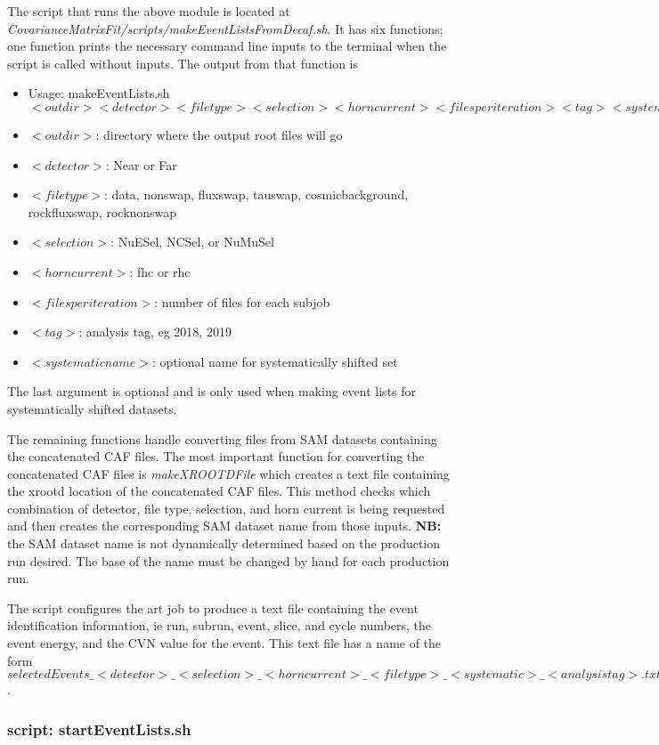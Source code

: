 The script that runs the above module is located at {\it CovarianceMatrixFit/scripts/makeEventListsFromDecaf.sh}.  It has six functions; one function prints the necessary command line inputs to the terminal when the script is called without inputs.  The output from that function is
\begin{itemize}
 \item Usage: makeEventLists.sh $<outdir> <detector> <file type> <selection> <horn current> <files per iteration> <tag> <systematic name>$
 \item $<outdir>$: directory where the output root files will go
 \item $<detector>$: Near or Far
 \item $<file type>$: data, nonswap, fluxswap, tauswap, cosmicbackground, rockfluxswap, rocknonswap
 \item $<selection>$: NuESel, NCSel, or NuMuSel
 \item $<horn current>$: fhc or rhc
 \item $<files per iteration>$: number of files for each subjob
 \item $<tag>$: analysis tag, eg 2018, 2019
 \item $<systematic name>$: optional name for systematically shifted set
\end{itemize}
The last argument is optional and is only used when making event lists for systematically shifted datasets.

The remaining functions handle converting files from SAM datasets containing the concatenated CAF files. The most important function for converting the concatenated CAF files is {\it makeXROOTDFile} which creates a text file containing the xrootd location of the concatenated CAF files.  This method checks which combination of detector, file type, selection, and horn current is being requested and then creates the corresponding SAM dataset name from those inputs.  {\bf NB:} the SAM dataset name is not dynamically determined based on the production run desired.  The base of the name must be changed by hand for each production run.

The script configures the art job to produce a text file containing the event identification information, ie run, subrun, event, slice, and cycle numbers, the event energy, and the CVN value for the event.  This text file has a name of the form $selectedEvents\_<detector>\_<selection>\_<horn current>\_<file type>\_<systematic>\_<analysis tag>.txt$. 

\subsubsection{script: startEventLists.sh}

